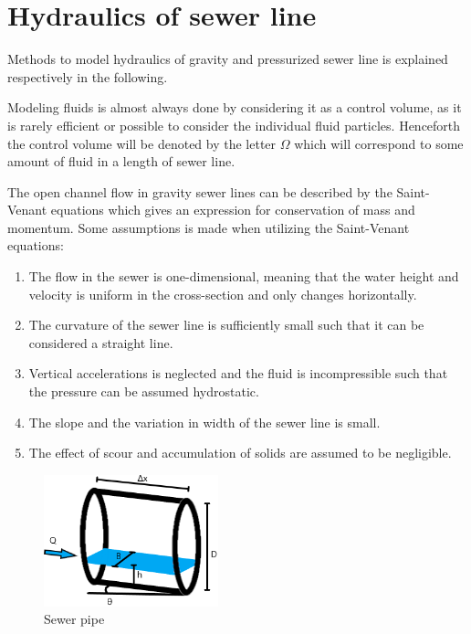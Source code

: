 \section{Hydraulics of sewer line}\label{se:hydraulics_of_sewer_line}

Methods to model hydraulics of gravity and pressurized sewer line is explained respectively in the following. 

Modeling fluids is almost always done by considering it as a control volume, as it is rarely efficient or possible to consider the individual fluid particles.
Henceforth the control volume will be denoted by the letter $\Omega$ which will correspond to some amount of fluid in a length of sewer line.

The open channel flow in gravity sewer lines can be described by the Saint-Venant equations which gives an expression for conservation of mass and momentum.
Some assumptions is made when utilizing the Saint-Venant equations:
\begin{table}[H]
\begin{enumerate}
\item The flow in the sewer is one-dimensional, meaning that the water height and velocity is uniform in the cross-section and only changes horizontally.
\item The curvature of the sewer line is sufficiently small such that it can be considered a straight line. 
\item Vertical accelerations is neglected and the fluid is incompressible such that the pressure can be assumed hydrostatic.
\item The slope and the variation in width of the sewer line is small.
\item The effect of scour and accumulation of solids are assumed to be negligible. 
\end{enumerate}
\label{tab:saintbernard_assumptions}
\end{table}


\begin{figure}[H]
\centering
\includegraphics[width=0.45\textwidth]{report/modeling/pictures/kloakroer.png}
\caption{Sewer pipe }
\label{fig:kloakroer}
\end{figure}



